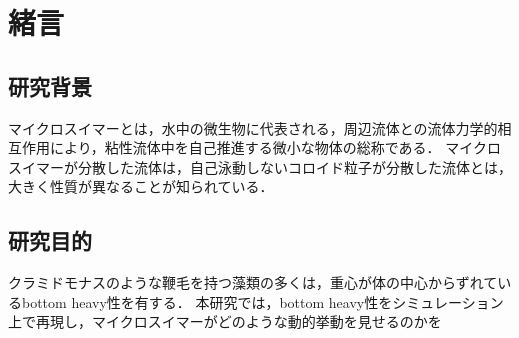 \documentclass[12pt, a4j, dvipdfmx]{jarticle}
\begin{document}
\section{\large 緒言}

\subsection{研究背景}
\par
マイクロスイマーとは，水中の微生物に代表される，周辺流体との流体力学的相互作用により，粘性流体中を自己推進する微小な物体の総称である．
マイクロスイマーが分散した流体は，自己泳動しないコロイド粒子が分散した流体とは，大きく性質が異なることが知られている．



\subsection{研究目的}
\par
クラミドモナスのような鞭毛を持つ藻類の多くは，重心が体の中心からずれているbottom heavy性を有する．
本研究では，bottom heavy性をシミュレーション上で再現し，マイクロスイマーがどのような動的挙動を見せるのかを
\end{document}
